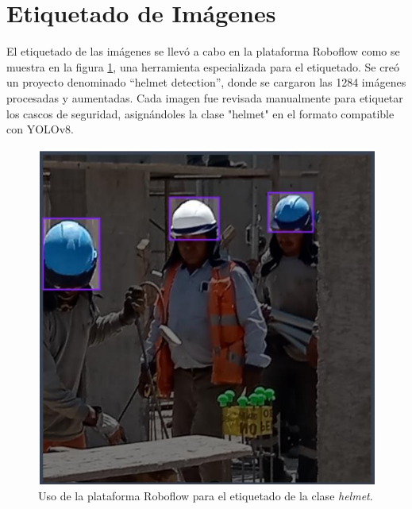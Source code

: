 \section{Etiquetado de Imágenes}

El etiquetado de las imágenes se llevó a cabo en la plataforma Roboflow como se muestra en la figura \ref{fig:roboflow_use}, una herramienta especializada para el etiquetado. Se creó un proyecto denominado ``helmet detection'', donde se cargaron las 1284 imágenes procesadas y aumentadas. Cada imagen fue revisada manualmente para etiquetar los cascos de seguridad, asignándoles la clase "helmet" en el formato compatible con YOLOv8.

\begin{figure}[!ht]
  \centering
  \includegraphics[width=.49\linewidth]{images/roboflow_use.png}
  \caption{Uso de la plataforma Roboflow para el etiquetado de la clase \textit{helmet}.}
  \label{fig:roboflow_use}
\end{figure}


